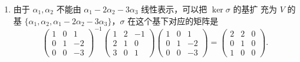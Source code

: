 \documentclass[12pt,fontset=fandol]{ctexart}
\begin{document}
\begin{solve}
\begin{enumerate}
        \item 由于 $\alpha_{1}, \alpha_{2}$ 不能由 $\alpha_{1}-2 \alpha_{2}-3 \alpha_{3}$ 线性表示，可以把 $\ker \sigma$ 的基扩 充为 $V$ 的基 $\{\alpha_{1}, \alpha_{2}, \alpha_{1}-2 \alpha_{2}-3 \alpha_{3}\}$，$\sigma$ 在这个基下对应的矩阵是
              \[\begin{pmatrix}
                      1 & 0 & 1  \\
                      0 & 1 & -2 \\
                      0 & 0 & -3
                  \end{pmatrix}^{-1}\begin{pmatrix}
                      1 & 2 & -1 \\
                      2 & 1 & 0  \\
                      3 & 0 & 1
                  \end{pmatrix}\begin{pmatrix}
                      1 & 0 & 1  \\
                      0 & 1 & -2 \\
                      0 & 0 & -3
                  \end{pmatrix}=\begin{pmatrix}
                      2 & 2 & 0 \\
                      0 & 1 & 0 \\
                      1 & 0 & 0
                  \end{pmatrix}.\]
    \end{enumerate}
\end{solve}
\end{document}
